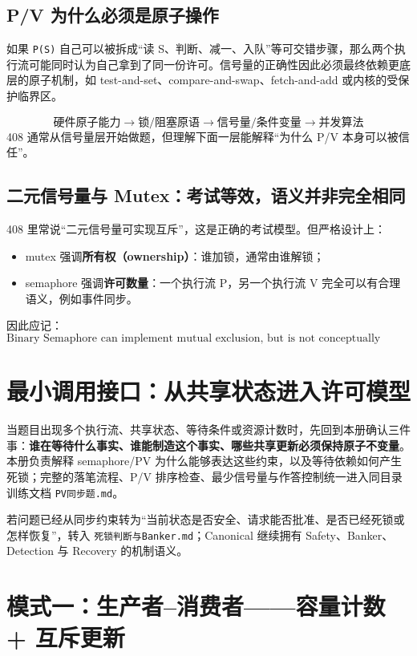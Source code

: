 \documentclass[11pt,a4paper]{ctexart}
\newcommand{\kw}[1]{\textbf{#1}}
\newcommand{\code}[1]{\texttt{#1}}
\begin{document}
\subsection{P/V 为什么必须是原子操作}

如果 \code{P(S)} 自己可以被拆成“读 S、判断、减一、入队”等可交错步骤，那么两个执行流可能同时认为自己拿到了同一份许可。信号量的正确性因此必须最终依赖更底层的原子机制，如 test-and-set、compare-and-swap、fetch-and-add 或内核的受保护临界区。

\begin{pattern}[抽象层次]
\[
\boxed{
\text{硬件原子能力}
\to\text{锁/阻塞原语}
\to\text{信号量/条件变量}
\to\text{并发算法}
}
\]
408 通常从信号量层开始做题，但理解下面一层能解释“为什么 P/V 本身可以被信任”。
\end{pattern}

\subsection{二元信号量与 Mutex：考试等效，语义并非完全相同}

408 里常说“二元信号量可实现互斥”，这是正确的考试模型。但严格设计上：
\begin{itemize}
\item mutex 强调\kw{所有权（ownership）}：谁加锁，通常由谁解锁；
\item semaphore 强调\kw{许可数量}：一个执行流 P，另一个执行流 V 完全可以有合理语义，例如事件同步。
\end{itemize}
因此应记：
\[
\boxed{\text{Binary Semaphore can implement mutual exclusion, but is not conceptually identical to a mutex.}}
\]

\section{最小调用接口：从共享状态进入许可模型}

当题目出现多个执行流、共享状态、等待条件或资源计数时，先回到本册确认三件事：\kw{谁在等待什么事实、谁能制造这个事实、哪些共享更新必须保持原子不变量}。本册负责解释 semaphore/PV 为什么能够表达这些约束，以及等待依赖如何产生死锁；完整的落笔流程、P/V 排序检查、最少信号量与作答控制统一进入同目录训练文档 \texttt{PV同步题.md}。

若问题已经从同步约束转为“当前状态是否安全、请求能否批准、是否已经死锁或怎样恢复”，转入 \texttt{死锁判断与Banker.md}；Canonical 继续拥有 Safety、Banker、Detection 与 Recovery 的机制语义。

\section{模式一：生产者--消费者——容量计数 + 互斥更新}
\end{document}
